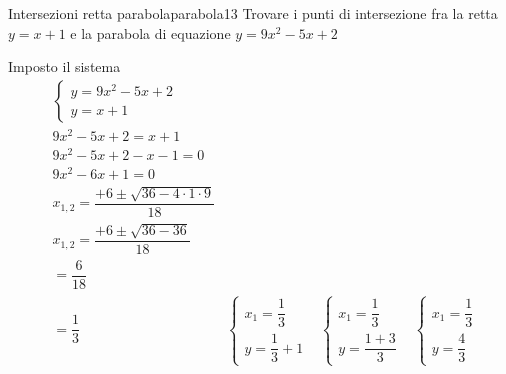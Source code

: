\begin{esempiot}{Intersezioni retta parabola}{parabola13}
	Trovare i punti di intersezione fra la retta $y=x+1$ e la parabola di equazione $y=9x^2-5x+2$
\end{esempiot}
Imposto il sistema
\begin{align*}
&\begin{cases}
y=9x^2-5x+2\\
y=x+1
\end{cases}\\
&9x^2-5x+2=x+1\\
&9x^2-5x+2-x-1=0\\
&9x^2-6x+1=0\\
&x_{1,2}=\dfrac{+6\pm\sqrt{36-4\cdot 1\cdot 9}}{18}\\
&x_{1,2}=\dfrac{+6\pm\sqrt{36-36}}{18}\\
&=\dfrac{6}{18}\\
&=\dfrac{1}{3}
&\begin{cases}
x_1=\dfrac{1}{3}\\
y=\dfrac{1}{3}+1
\end{cases}
&\begin{cases}
x_1=\dfrac{1}{3}\\
y=\dfrac{1+3}{3}
\end{cases}
&\begin{cases}
x_1=\dfrac{1}{3}\\
y=\dfrac{4}{3}
\end{cases}
\end{align*}

\begin{center}
	
	\label{fig:disegnoparabola13}
\end{center}
